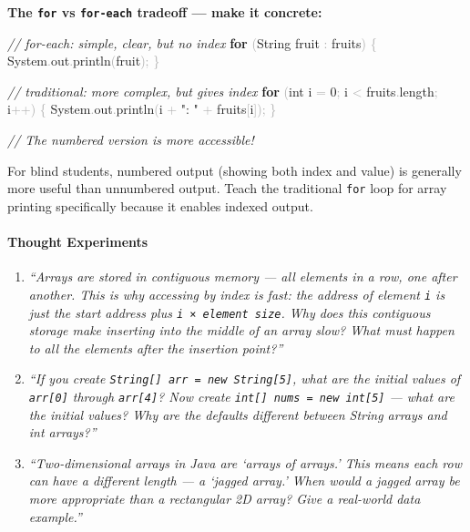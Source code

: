 \documentclass[
  justified,
  openright,
]{tufte-book}
\let\paragraph\paragraph
\newcommand{\KeywordTok}[1]{\textcolor{CodeKeyword}{\textbf{#1}}}  %
\newcommand{\StringTok}[1]{\textcolor{CodeString}{#1}}              %
\newcommand{\CommentTok}[1]{\textcolor{CodeComment}{\textit{#1}}}  %
\newcommand{\CodeNumTok}[1]{\textcolor{CodeNumber}{#1}}             %
\newcommand{\CodeFuncTok}[1]{\textcolor{CodeKeyword}{#1}}           %
\newcommand{\CodeTypeTok}[1]{\textcolor{CodeType}{#1}}              %
\newcommand{\OperatorTok}[1]{\textcolor{DarkGray}{#1}}              %
\newenvironment{Shaded}{%
  \begin{mdframed}[style=TufteCode]%
}{%
  \end{mdframed}%
}
\let\paragraph\paragraph
\begin{document}
\textbf{The \texttt{for} vs \texttt{for-each} tradeoff --- make it
concrete:}

\begin{Shaded}
\begin{Highlighting}[]
\CommentTok{// for{-}each: simple, clear, but no index}
\KeywordTok{for} \OperatorTok{(}String fruit \OperatorTok{:} fruits\OperatorTok{)} \OperatorTok{\{}
    System\OperatorTok{.}\CodeFuncTok{out}\OperatorTok{.}\CodeFuncTok{println}\OperatorTok{(}fruit\OperatorTok{);}
\OperatorTok{\}}
 
\CommentTok{// traditional: more complex, but gives index}
\KeywordTok{for} \OperatorTok{(}\CodeTypeTok{int} i \OperatorTok{=} \CodeNumTok{0}\OperatorTok{;} i \OperatorTok{\textless{}} fruits\OperatorTok{.}\CodeFuncTok{length}\OperatorTok{;} i\OperatorTok{++)} \OperatorTok{\{}
    System\OperatorTok{.}\CodeFuncTok{out}\OperatorTok{.}\CodeFuncTok{println}\OperatorTok{(}i \OperatorTok{+} \StringTok{": "} \OperatorTok{+} fruits\OperatorTok{[}i\OperatorTok{]);}
\OperatorTok{\}}
 
\CommentTok{// The numbered version is more accessible!}
\end{Highlighting}
\end{Shaded}

For blind students, numbered output (showing both index and value) is
generally more useful than unnumbered output. Teach the traditional
\texttt{for} loop for array printing specifically because it enables
indexed output.

\paragraph{Thought Experiments}\label{thought-experiments-35}

\begin{enumerate}
\def\labelenumi{\arabic{enumi}.}
\item
  \emph{``Arrays are stored in contiguous memory --- all elements in a
  row, one after another. This is why accessing by index is fast: the
  address of element \texttt{i} is just the start address plus
  \texttt{i\ ×\ element\ size}. Why does this contiguous storage make
  inserting into the middle of an array slow? What must happen to all
  the elements after the insertion point?''}
\item
  \emph{``If you create
  \texttt{String{[}{]}\ arr\ =\ new\ String{[}5{]}}, what are the
  initial values of \texttt{arr{[}0{]}} through \texttt{arr{[}4{]}}? Now
  create \texttt{int{[}{]}\ nums\ =\ new\ int{[}5{]}} --- what are the
  initial values? Why are the defaults different between String arrays
  and int arrays?''}
\item
  \emph{``Two-dimensional arrays in Java are `arrays of arrays.' This
  means each row can have a different length --- a `jagged array.' When
  would a jagged array be more appropriate than a rectangular 2D array?
  Give a real-world data example.''}
\end{enumerate}
\end{document}
